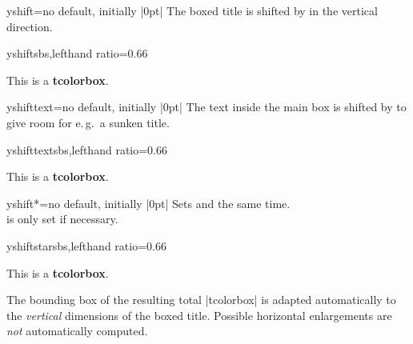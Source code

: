 \begin{boxTcbKey}{yshift}{=}{no default, initially |0pt|}
The boxed title is shifted by  in the vertical direction.
\begin{exdispExample*}{yshift}{sbs,lefthand ratio=0.66}
\begin{tcolorbox}[enhanced,title=My title,
  attach boxed title to top center=
    {yshift=-\tcboxedtitleheight/2},
  boxed title style={size=small,colback=blue}]
  This is a \textbf{tcolorbox}.
\end{tcolorbox}
\end{exdispExample*}
\end{boxTcbKey}

\begin{boxTcbKey}{yshifttext}{=}{no default, initially |0pt|}
The text inside the main box is shifted by  to give room for e.\,g.\ a sunken title.
\begin{exdispExample*}{yshifttext}{sbs,lefthand ratio=0.66}
\begin{tcolorbox}[enhanced,title=My title,
  attach boxed title to top center=
    {yshift=-3mm,yshifttext=-1mm},
  boxed title style={size=small,colback=blue}]
  This is a \textbf{tcolorbox}.
\end{tcolorbox}
\end{exdispExample*}
\end{boxTcbKey}

\begin{boxTcbKey}{yshift*}{=}{no default, initially |0pt|}
Sets  and 
the same time.\\
 is only set if necessary.
\begin{exdispExample*}{yshiftstar}{sbs,lefthand ratio=0.66}
\begin{tcolorbox}[enhanced,title=My title,
  attach boxed title to top center={yshift*=-3mm},
  boxed title style={size=small,colback=blue}]
  This is a \textbf{tcolorbox}.
\end{tcolorbox}
\end{exdispExample*}
\end{boxTcbKey}

\begin{marker}
The bounding box of the resulting total |tcolorbox| is adapted automatically to the
\emph{vertical} dimensions of the boxed title. Possible horizontal enlargements
are \emph{not} automatically computed.
\end{marker}


